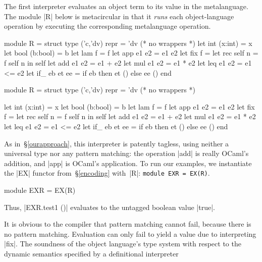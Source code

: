 The first interpreter evaluates an object term to its value in the
metalanguage.  The module |R| below is metacircular in that it
\emph{runs} each object\hyp language
operation by executing the corresponding metalanguage operation.
\ifshort
\begin{code3}
module R = struct type ('c,'dv) repr = 'dv (* no wrappers *)
  let int  (x:int)  = x         let bool (b:bool) = b
  let lam  f        = f         let app  e1 e2    = e1 e2
  let fix  f        = let rec self n = f self n in self
  let add  e1 e2    = e1 + e2   let mul  e1 e2    = e1 * e2
  let leq  e1 e2    = e1 <= e2
  let if_  eb et ee = if eb then et () else ee () end
\end{code3}
\else
\begin{code}
module R = struct
  type ('c,'dv) repr = 'dv (* no wrappers *)

  let int  (x:int)  = x
  let bool (b:bool) = b
  let lam  f        = f
  let app  e1 e2    = e1 e2
  let fix  f        = let rec self n = f self n in self
  let add  e1 e2    = e1 + e2
  let mul  e1 e2    = e1 * e2
  let leq  e1 e2    = e1 <= e2
  let if_  eb et ee = if eb then et () else ee ()
end
\end{code}
\fi
%
As in~\S\ref{ourapproach},
this interpreter is patently tagless, using neither a universal type nor
any pattern matching: the operation |add| is really
OCaml's addition, and |app| is OCaml's application. To run our
examples, we instantiate the |EX| functor from~\S\ref{encoding}
with~|R|\ifshort: \texttt{module EXR = EX(R)}\fi.
\ifshort\else
\begin{code}
module EXR = EX(R)
\end{code}
\fi
Thus, |EXR.test1 ()| evaluates to the untagged boolean value |true|.
\begin{comment}
In Haskell, we define
\begin{code}
newtype R a = R {unR::a}
instance Symantics R where ...
\end{code}
Although |R| looks like a tag, it is only
a |newtype|.  The types |a| and |R a| are represented differently
only at compile time, not at run time.  Pattern matching against~|R|
cannot ever fail and is assuredly compiled away.
\end{comment}
It is obvious to the compiler that
pattern matching cannot fail, because there is no
pattern matching. Evaluation can only fail to yield a value
due to interpreting |fix|.
The soundness of the object language's type system with respect to
the dynamic semantics specified by a definitional interpreter
